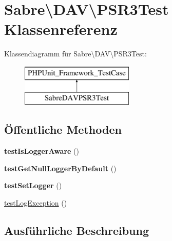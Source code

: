 \hypertarget{class_sabre_1_1_d_a_v_1_1_p_s_r3_test}{}\section{Sabre\textbackslash{}D\+AV\textbackslash{}P\+S\+R3\+Test Klassenreferenz}
\label{class_sabre_1_1_d_a_v_1_1_p_s_r3_test}
Klassendiagramm für Sabre\textbackslash{}D\+AV\textbackslash{}P\+S\+R3\+Test\+:\begin{figure}[H]
\begin{center}
\leavevmode
\includegraphics[height=2.000000cm]{class_sabre_1_1_d_a_v_1_1_p_s_r3_test}
\end{center}
\end{figure}
\subsection*{Öffentliche Methoden}
\begin{DoxyCompactItemize}
\item 
\mbox{\label{class_sabre_1_1_d_a_v_1_1_p_s_r3_test_abd1a521dd56e50d4e4fee3b2d48817e7}} 
{\bfseries test\+Is\+Logger\+Aware} ()
\item 
\mbox{\label{class_sabre_1_1_d_a_v_1_1_p_s_r3_test_a2f5cb54dc69199d9e19181f14187ab3d}} 
{\bfseries test\+Get\+Null\+Logger\+By\+Default} ()
\item 
\mbox{\label{class_sabre_1_1_d_a_v_1_1_p_s_r3_test_acd1d5a0d983aebab8ca23fcb8e455ef1}} 
{\bfseries test\+Set\+Logger} ()
\item 
\mbox{\hyperlink{class_sabre_1_1_d_a_v_1_1_p_s_r3_test_a1aa4dff7e1e27e0fb45b9cbaae65ac26}{test\+Log\+Exception}} ()
\end{DoxyCompactItemize}


\subsection{Ausführliche Beschreibung}


